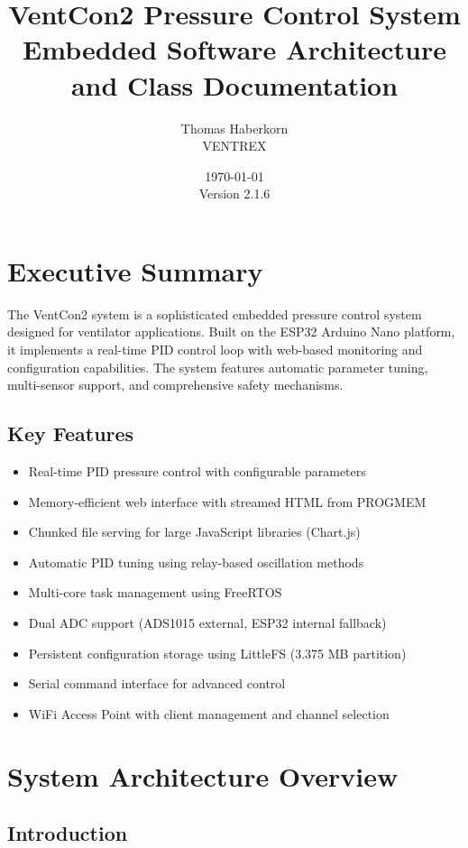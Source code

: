 \documentclass[12pt,a4paper]{article}
\title{\textbf{VentCon2 Pressure Control System}\\
       \large{Embedded Software Architecture and Class Documentation}}
\author{Thomas Haberkorn\\VENTREX}
\date{\today\\Version 2.1.6}
\begin{document}
\maketitle

\tableofcontents
\newpage

\section{Executive Summary}

The VentCon2 system is a sophisticated embedded pressure control system designed for ventilator applications. Built on the ESP32 Arduino Nano platform, it implements a real-time PID control loop with web-based monitoring and configuration capabilities. The system features automatic parameter tuning, multi-sensor support, and comprehensive safety mechanisms.

\subsection{Key Features}
\begin{itemize}
    \item Real-time PID pressure control with configurable parameters
    \item Memory-efficient web interface with streamed HTML from PROGMEM
    \item Chunked file serving for large JavaScript libraries (Chart.js)
    \item Automatic PID tuning using relay-based oscillation methods
    \item Multi-core task management using FreeRTOS
    \item Dual ADC support (ADS1015 external, ESP32 internal fallback)
    \item Persistent configuration storage using LittleFS (3.375 MB partition)
    \item Serial command interface for advanced control
    \item WiFi Access Point with client management and channel selection
\end{itemize}

\section{System Architecture Overview}

\subsection{Introduction}
\end{document}
